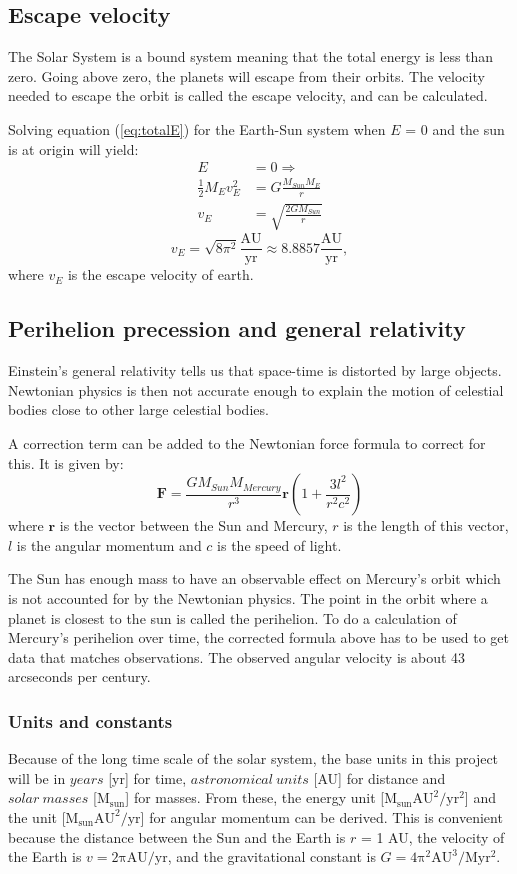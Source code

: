 \documentclass[10pt,a4paper,titlepage]{article}
\begin{document}
\subsection{Escape velocity}
The Solar System is a bound system meaning that the total energy is less than zero. Going above zero, the planets will escape from their orbits. The velocity needed to escape the orbit is called the escape velocity, and can be calculated. 

Solving equation (\ref{eq:totalE}) for the Earth-Sun system when $E$ = 0 and the sun is at origin will yield:
\begin{align*}
E &= 0 \Rightarrow \\
\frac{1}{2}M_{E}v^2_{E} &= G\frac{M_{Sun}M_{E}}{r} \\
v_{E} &= \sqrt{\frac{2GM_{Sun}}{r}} 
\end{align*}
\begin{equation}
v_{E} = \sqrt{8\pi^{2}} \mathrm{\frac{AU}{yr}} \approx 8.8857 \mathrm{\frac{AU}{yr}},
\end{equation}
where $v_{E}$ is the escape velocity of earth. 

\subsection{Perihelion precession and general relativity}
Einstein's general relativity tells us that space-time is distorted by large objects. Newtonian physics is then not accurate enough to explain the motion of celestial bodies close to other large celestial bodies. 

A correction term can be added to the Newtonian force formula to correct for this. It is given by:
\begin{equation}
\mathbf{F}=\frac{GM_{Sun}M_{Mercury}}{r^3}\mathbf{r}\left(1+\frac{3l^2}{r^2c^2}\right)
\end{equation}
where $\mathbf{r}$ is the vector between the Sun and Mercury, $r$ is the length of this vector, $l$ is the angular momentum and $c$ is the speed of light. 

The Sun has enough mass to have an observable effect on Mercury's orbit which is not accounted for by the Newtonian physics. The point in the orbit where a planet is closest to the sun is called the perihelion. To do a calculation of Mercury's perihelion over time, the corrected formula above has to be used to get data that matches observations. The observed angular velocity is about 43 arcseconds per century. 

\subsubsection{Units and constants} 
Because of the long time scale of the solar system, the base units in this project will be in $years$ [yr] for time,  $astronomical \ units$ [AU] for distance and $solar \ masses$ [$\mathrm{M_{sun}}$] for masses. From these, the energy unit [$\mathrm{M_{sun}AU^2/yr^2}$] and the unit [$\mathrm{M_{sun}AU^2/yr}$] for angular momentum can be derived. 
This is convenient because the distance between the Sun and the Earth is $r$ = 1 AU, the velocity of the Earth is $v\mathrm{ = 2\pi AU/yr}$, and the gravitational constant is $G\mathrm{ = 4\pi^2 AU^3/Myr^2}$.
\end{document}
